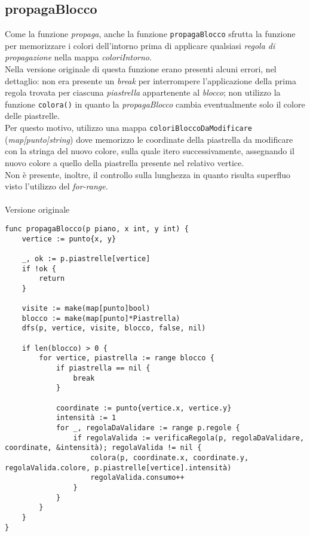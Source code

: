 \documentclass{article}
\begin{document}
\subsection{propagaBlocco}
Come la funzione \textit{propaga}, anche la funzione \texttt{propagaBlocco} sfrutta la funzione  per memorizzare i colori dell'intorno prima di applicare qualsiasi \textit{regola di propagazione} nella mappa \textit{coloriIntorno}.\\
Nella versione originale di questa funzione erano presenti alcuni errori, nel dettaglio: non era presente un \textit{break} per interrompere l'applicazione della prima regola trovata per ciascuna \textit{piastrella} appartenente al \textit{blocco}; non utilizzo la funzione \texttt{colora()} in quanto la \textit{propagaBlocco} cambia eventualmente solo il colore delle piastrelle.\\
Per questo motivo, utilizzo una mappa \texttt{coloriBloccoDaModificare} (\textit{map[punto]string}) dove memorizzo le coordinate della piastrella da modificare  con la stringa del nuovo colore, sulla quale itero successivamente, assegnando il nuovo colore a quello della piastrella presente nel relativo vertice.\\
Non è presente, inoltre, il controllo sulla lunghezza in quanto risulta superfluo visto l'utilizzo del \textit{for-range}.
\\ \\
Versione originale
\begin{verbatim}
func propagaBlocco(p piano, x int, y int) {
	vertice := punto{x, y}

	_, ok := p.piastrelle[vertice]
	if !ok {
		return
	}

	visite := make(map[punto]bool)
	blocco := make(map[punto]*Piastrella)
	dfs(p, vertice, visite, blocco, false, nil)

	if len(blocco) > 0 {
		for vertice, piastrella := range blocco {
			if piastrella == nil {
				break
			}

			coordinate := punto{vertice.x, vertice.y}
			intensità := 1
			for _, regolaDaValidare := range p.regole {
				if regolaValida := verificaRegola(p, regolaDaValidare, coordinate, &intensità); regolaValida != nil {
					colora(p, coordinate.x, coordinate.y, regolaValida.colore, p.piastrelle[vertice].intensità)
					regolaValida.consumo++
				}
			}
		}
	}
}  
\end{verbatim}
\end{document}

